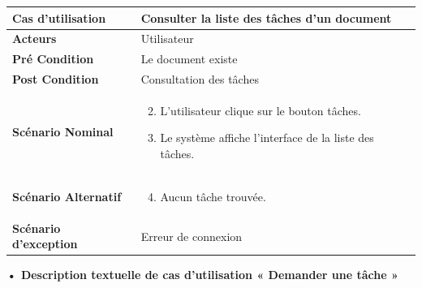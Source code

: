\begin{longtable}{|p{5cm}|p{10cm}|}
\hline
\textbf{Cas d'utilisation}&Consulter la liste des tâches d'un document\\
\hline
\textbf{Acteurs}&Utilisateur\\
\hline
\textbf{Pré Condition}&Le document existe\\
\hline
\textbf{Post Condition}&Consultation des tâches\\
\hline
\textbf{Scénario Nominal}&
\vspace{-\baselineskip}
\begin{enumerate}
    \setcounter{enumi}{1}
    \item L'utilisateur clique sur le bouton tâches.
    \item Le système affiche l'interface de la liste des tâches.
    
\end{enumerate}\\
\hline
\textbf{Scénario Alternatif}&
\vspace{-\baselineskip}
\begin{enumerate}
    \setcounter{enumi}{3}
    \item Aucun tâche trouvée.
\end{enumerate}\\
\hline
\textbf{Scénario d'exception}&Erreur de connexion\\
\hline
\end{longtable}



\textbf{•	Description textuelle de cas d'utilisation « Demander une tâche »}

